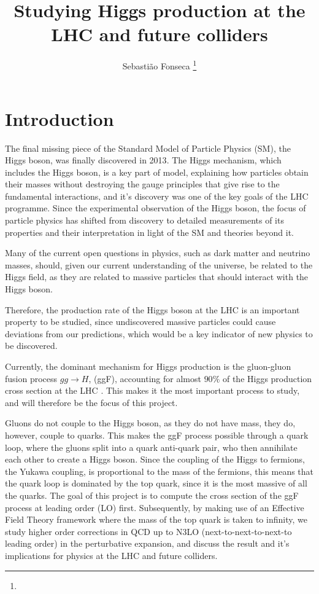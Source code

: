 \documentclass[EPJ,twocolumn]{webofc}
\title{ Studying Higgs production at the LHC and future colliders}
\author{Sebastião Fonseca\inst{1} \fnsep\thanks{\email{sebastiao.m.fonseca@tecnico.ulisboa.pt}}}
\institute{
Instituto Superior T\'ecnico, Lisboa, Portugal
\vskip 2mm
{\normalfont\normalsize\textsf Project supervisor: João Pires}
\mbox{}\hfill\today\hspace*{16mm}
}
\begin{document}
\maketitle

\section{\label{sec:intro}Introduction}

The final missing piece of the Standard Model of Particle Physics (SM), the Higgs boson, was finally discovered in 2013\cite{Higgs}.
The Higgs mechanism, which includes the Higgs boson, is a key part of model, explaining how particles obtain their masses without destroying the gauge principles that give rise to the fundamental interactions, and it's discovery was one of the key goals of the LHC programme. 
Since the experimental observation of the Higgs boson, the focus of particle physics has shifted from discovery to detailed measurements of its properties and their interpretation in light of the SM and theories beyond it.

Many of the current open questions in physics, such as dark matter and neutrino masses, should, given our current understanding of the universe, be related to the Higgs field, as they are related to massive particles that should interact with the Higgs boson.

Therefore, the production rate of the Higgs boson at the LHC is an important property to be studied, since undiscovered massive particles could cause deviations from our predictions, which would be a key indicator of new physics to be discovered. 

Currently, the dominant mechanism for Higgs production is the gluon-gluon fusion process $gg\rightarrow H$, (ggF), accounting for almost $90\%$ of the Higgs production cross section at the LHC \cite{ATLAS:2015egz}. 
This makes it the most important process to study, and will therefore be the focus of this project.

Gluons do not couple to the Higgs boson, as they do not have mass, they do, however, couple to quarks. This makes the ggF process possible through a quark loop, where the gluons split into a quark anti-quark pair, who then annihilate each other to create a Higgs boson. 
Since the coupling of the Higgs to fermions, the Yukawa coupling, is proportional to the mass of the fermions, this means that the quark loop is dominated by the top quark, since it is the most massive of all the quarks. 
The goal of this project is to compute the cross section of the ggF process at leading order (LO) first. Subsequently, by making use of an Effective Field Theory framework where the mass of the top quark is taken to infinity, we study higher order corrections in QCD up to N3LO (next-to-next-to-next-to leading order) in the perturbative expansion, and discuss the result and it’s implications for physics at the LHC and future colliders.
\end{document}
